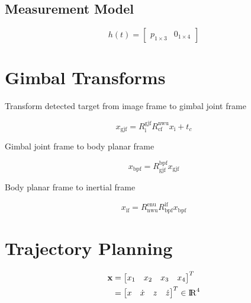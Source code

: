 \documentclass[letterpaper, 10 pt, conference]{ieeeconf}
\begin{document}
\subsection{Measurement Model}

\begin{equation}
  h(t) = \begin{bmatrix} p_{1 \times 3} & {0}_{1 \times 4} \end{bmatrix}
\end{equation}


\section{Gimbal Transforms}

Transform detected target from image frame to gimbal joint frame

\begin{equation}
  x_{\text{gjf}} = R^{\text{gjf}}_{\text{i}}
    R^{\text{nwu}}_{\text{cf}}
    x_{\text{i}} + t_{c}
\end{equation}

Gimbal joint frame to body planar frame

\begin{equation}
  x_{\text{bpf}} = R^{\text{bpf}}_{\text{gjf}} x_{\text{gjf}}
\end{equation}

Body planar frame to inertial frame

\begin{equation}
  x_{\text{if}} = R^{\text{enu}}_{\text{nwu}}
    R^{\text{if}}_{\text{bpf}}
    x_{\text{bpf}}
\end{equation}



\section{Trajectory Planning}

\begin{equation}
  \begin{split}
    \textbf{x} 
      &= \begin{bmatrix}
        x_{1} & x_{2} & x_{3} & x_{4}
      \end{bmatrix}^{T} \\ 
      &= \begin{bmatrix}
        x & \dot{x} & z & \dot{z}
      \end{bmatrix}^{T} \in {\rm I\!R}^{4}
  \end{split}
\end{equation}
\end{document}
